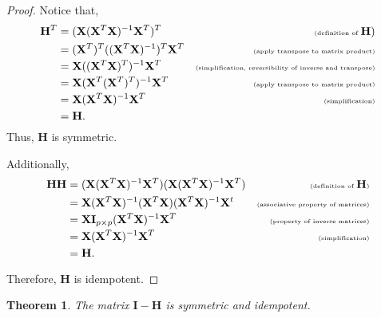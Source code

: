 \documentclass[
]{book}
\newtheorem{theorem}{Theorem}[chapter]
\theoremstyle{definition}
\theoremstyle{definition}
\theoremstyle{definition}
\theoremstyle{definition}
\theoremstyle{remark}
\begin{document}
\begin{proof}
Notice that,
\[
\begin{aligned}
\mathbf{H}^T&=(\mathbf{X}(\mathbf{X}^T\mathbf{X})^{-1}\mathbf{X}^T)^T&\tiny\text{(definition of }\mathbf{H})\\
&=(\mathbf{X}^T)^T((\mathbf{X}^T\mathbf{X})^{-1})^T\mathbf{X}^T&\tiny\text{(apply transpose to matrix product)}\\
&=\mathbf{X}((\mathbf{X}^T\mathbf{X})^T)^{-1}\mathbf{X}^T&\tiny\text{(simplification, reversibility of inverse and transpose)}\\
&=\mathbf{X}(\mathbf{X}^T(\mathbf{X}^T)^T)^{-1}\mathbf{X}^T&\tiny\text{(apply transpose to matrix product)}\\
&=\mathbf{X}(\mathbf{X}^T\mathbf{X})^{-1}\mathbf{X}^T&\tiny\text{(simplification)}\\
&=\mathbf{H}.
\end{aligned}
\]
Thus, \(\mathbf{H}\) is symmetric.

Additionally,
\[
\begin{aligned}
\mathbf{H}\mathbf{H}&=(\mathbf{X}(\mathbf{X}^T\mathbf{X})^{-1}\mathbf{X}^T)(\mathbf{X}(\mathbf{X}^T\mathbf{X})^{-1}\mathbf{X}^T)&\tiny\text{(definition of }\mathbf{H}\text{)}\\
&=\mathbf{X}(\mathbf{X}^T\mathbf{X})^{-1}(\mathbf{X}^T\mathbf{X})(\mathbf{X}^T\mathbf{X})^{-1}\mathbf{X}^t&\tiny\text{(associative property of matrices)}\\
&=\mathbf{X}\mathbf{I}_{p\times p}(\mathbf{X}^T\mathbf{X})^{-1}\mathbf{X}^T&\tiny\text{(property of inverse matrices)}\\
&=\mathbf{X}(\mathbf{X}^T\mathbf{X})^{-1}\mathbf{X}^T&\tiny\text{(simplification)}\\
&=\mathbf{H}.
\end{aligned}
\]

Therefore, \(\mathbf{H}\) is idempotent.
\end{proof}

\begin{theorem}
\protect\hypertarget{thm:i-h-properties}{}\label{thm:i-h-properties}The matrix \(\mathbf{I} - \mathbf{H}\) is symmetric and idempotent.
\end{theorem}
\end{document}
